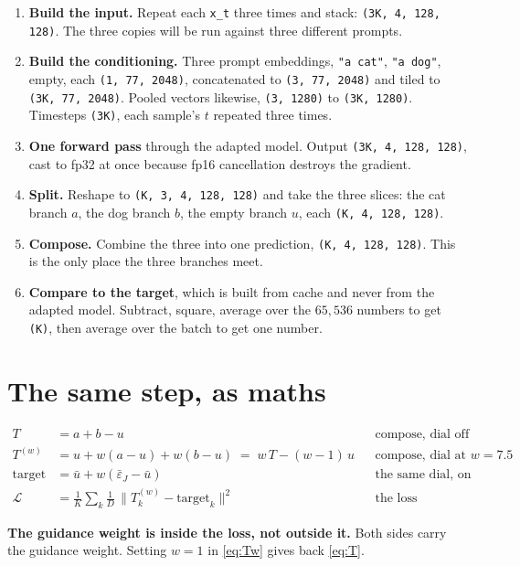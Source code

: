 \documentclass[11pt]{article}
\newcommand{\eps}{\varepsilon}
\newcommand{\shape}[1]{\texttt{(#1)}}
\newcommand{\B}[1]{\textbf{#1}}
\newcommand{\LL}{\mathcal{L}}
\newcommand{\sq}[1]{\Big\lVert #1 \Big\rVert^2}
\begin{document}
\begin{enumerate}
\item \B{Build the input.} Repeat each \texttt{x\_t} three times and stack:
  \shape{3K, 4, 128, 128}. The three copies will be run against three different prompts.
\item \B{Build the conditioning.} Three prompt embeddings, \texttt{"a cat"}, \texttt{"a dog"},
  empty, each \shape{1, 77, 2048}, concatenated to \shape{3, 77, 2048} and tiled to
  \shape{3K, 77, 2048}. Pooled vectors likewise, \shape{3, 1280} to \shape{3K, 1280}. Timesteps
  \shape{3K}, each sample's $t$ repeated three times.
\item \B{One forward pass} through the adapted model. Output \shape{3K, 4, 128, 128}, cast to fp32
  at once because fp16 cancellation destroys the gradient.
\item \B{Split.} Reshape to \shape{K, 3, 4, 128, 128} and take the three slices: the cat branch
  $a$, the dog branch $b$, the empty branch $u$, each \shape{K, 4, 128, 128}.
\item \B{Compose.} Combine the three into one prediction, \shape{K, 4, 128, 128}. This is the only
  place the three branches meet.
\item \B{Compare to the target}, which is built from cache and never from the adapted model.
  Subtract, square, average over the $65{,}536$ numbers to get \shape{K}, then average over the
  batch to get one number.
\end{enumerate}

\section{The same step, as maths}

\begin{align}
  T &= a + b - u
  &&\text{compose, dial off}
  \label{eq:T}\\
  T^{(w)} &= u + w(a-u) + w(b-u) \;=\; w\,T - (w-1)\,u
  &&\text{compose, dial at } w = 7.5
  \label{eq:Tw}\\
  \text{target} &= \bar u + w(\bar\eps_J - \bar u)
  &&\text{the same dial, on cached tensors}
  \label{eq:tgt}\\
  \LL &= \frac{1}{K}\sum_k \frac{1}{D}\,\sq{T^{(w)}_k - \text{target}_k}
  &&\text{the loss}
  \label{eq:L}
\end{align}

\B{The guidance weight is inside the loss, not outside it.} Both sides carry the guidance weight. Setting $w=1$ in
\eqref{eq:Tw} gives back \eqref{eq:T}.
\end{document}
